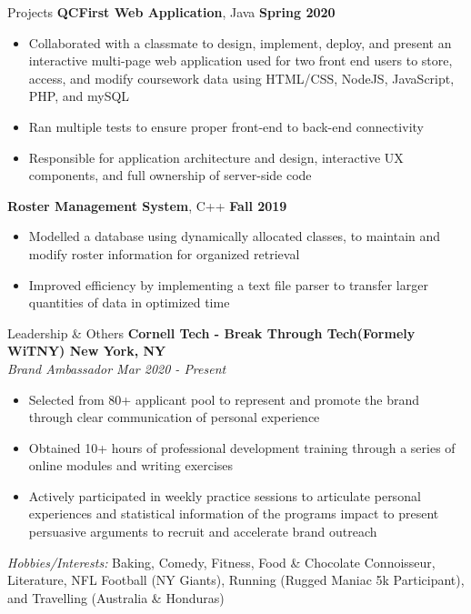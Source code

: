 \documentclass{resume}
\begin{document}
\begin{rSection}{Projects}
{\bf QCFirst Web Application}, Java \hfill {\bf Spring 2020} 
        \begin{itemize}
            \itemsep-0.6em 
            \item Collaborated with a classmate to design, implement, deploy, and present an interactive multi-page web application used for two front end users to store, access, and modify coursework data using HTML/CSS, NodeJS, JavaScript, PHP, and mySQL
            \item Ran multiple tests to ensure proper front-end to back-end connectivity 
            \item Responsible for application architecture and design, interactive UX components, and full ownership of server-side code 

        \end{itemize}
{\bf Roster Management System}, C++ \hfill {\bf Fall 2019}
        \begin{itemize}
            \itemsep-0.6em 
            \item Modelled a database using dynamically allocated classes, to maintain and modify roster information for organized retrieval 
            \item Improved efficiency by implementing a text file parser to transfer larger quantities of data in optimized time

        \end{itemize}
\end{rSection}
\begin{rSection}{Leadership \& Others}
{\bf Cornell Tech - Break Through Tech(Formely WiTNY) \hfill New York, NY} \\
{\it Brand Ambassador \hfill Mar 2020 - Present}
    \begin{itemize}
        \itemsep-0.6em 
        \item Selected from 80+ applicant pool to represent and promote the brand through clear communication of personal experience 
	    \item Obtained 10+ hours of professional development training through a series of online modules and writing exercises 
        \item Actively participated in weekly practice sessions to articulate personal experiences and statistical information of the programs impact to present persuasive arguments to recruit and accelerate brand outreach
    \end{itemize}
{\it Hobbies/Interests:} Baking, Comedy, Fitness, Food & Chocolate Connoisseur, Literature, NFL Football (NY Giants), Running (Rugged Maniac 5k Participant), and Travelling (Australia & Honduras)
\end{rSection}
\end{document}
